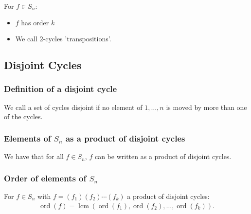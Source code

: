\documentclass[a4paper, 12pt, twoside]{article}
\DeclareMathOperator{\Ord}{ord}
\DeclareMathOperator{\Lcm}{lcm}
\begin{document}
For $f \in S_n$:

\begin{itemize}
      \item $f$ has order $k$
      \item We call $2$-cycles 'transpositions'.
\end{itemize}

\subsection{Disjoint Cycles}

\subsubsection{Definition of a disjoint cycle}

We call a set of cycles disjoint if no element of ${1, \ldots, n}$ is
moved by more than one of the cycles.

\subsubsection{Elements of $S_n$ as a product of disjoint cycles}

We have that for all $f \in S_n$, $f$ can be written as a product 
of disjoint cycles.

\subsubsection{Order of elements of $S_n$}

For $f \in S_n$ with $f = (f_1)(f_2)\cdots(f_k)$ a product of
disjoint cycles:
\begin{align*}
      \Ord(f) = \Lcm(\Ord(f_1), \Ord(f_2), \ldots, \Ord(f_k)).
\end{align*}
\end{document}
